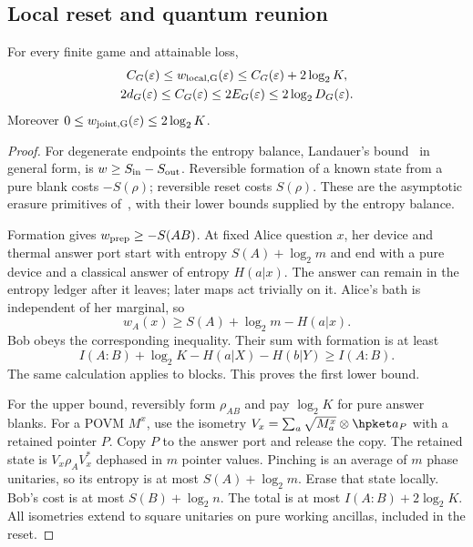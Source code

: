 \subsection{Local reset and quantum reunion}\label{hp:sec:local}
\begin{theorem}\label{hp:thm:local}
For every finite game and attainable loss,
\begin{gather}
 C_G(\varepsilon)\le w_{\rm local,G}(\varepsilon)\le C_G(\varepsilon)+2\log_2K,\label{hp:eq:local}\\
 2d_G(\varepsilon)\le C_G(\varepsilon)\le2E_G(\varepsilon)\le2\log_2D_G(\varepsilon).
 \label{hp:eq:sandwich}
\end{gather}
Moreover $0\le w_{\rm joint,G}(\varepsilon)\le2\log_2K$.
\end{theorem}
\begin{proof}
For degenerate endpoints the entropy balance, Landauer's bound~\cite{Landauer61} in general form, is $w\ge S_{\rm in}-S_{\rm out}$. Reversible formation of a known state from a pure blank costs $-S(\rho)$; reversible reset costs $S(\rho)$. These are the asymptotic erasure primitives of~\cite[Corollary 2 and Appendix D]{delRio11}, with their lower bounds supplied by the entropy balance.

Formation gives $w_{\rm prep}\ge-S(AB)$. At fixed Alice question $x$, her device and thermal answer port start with entropy $S(A)+\log_2m$ and end with a pure device and a classical answer of entropy $H(a|x)$. The answer can remain in the entropy ledger after it leaves; later maps act trivially on it. Alice's bath is independent of her marginal, so
\[
 w_A(x)\ge S(A)+\log_2m-H(a|x).
\]
Bob obeys the corresponding inequality. Their sum with formation is at least
\[
 I(A:B)+\log_2K-H(a|X)-H(b|Y)\ge I(A:B).
\]
The same calculation applies to blocks. This proves the first lower bound.

For the upper bound, reversibly form $\rho_{AB}$ and pay $\log_2K$ for pure answer blanks. For a POVM $M^x$, use the isometry $V_x=\sum_a\sqrt{M_a^x}\otimes\hpket a_P$ with a retained pointer $P$. Copy $P$ to the answer port and release the copy. The retained state is $V_x\rho_AV_x^*$ dephased in $m$ pointer values. Pinching is an average of $m$ phase unitaries, so its entropy is at most $S(A)+\log_2m$. Erase that state locally. Bob's cost is at most $S(B)+\log_2n$. The total is at most $I(A:B)+2\log_2K$. All isometries extend to square unitaries on pure working ancillas, included in the reset.


\end{proof}
